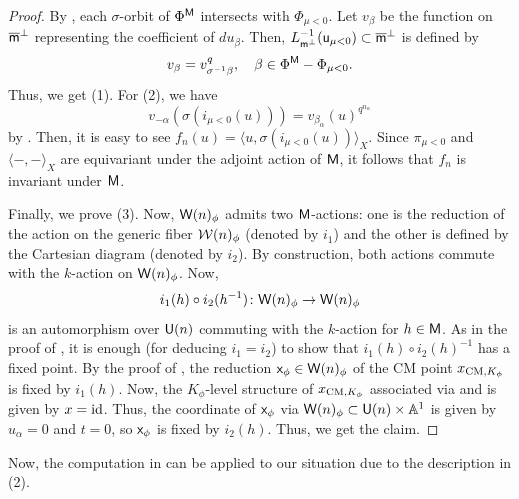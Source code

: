 \documentclass[12pt,reqno]{amsart}
\begin{document}
\begin{proof}
    By \cite[Lemma 3.2]{Tak25z}, each $\sigma$-orbit of $\Phi^{{\mathsf{M}}}$ intersects with $\Phi_{\mu < 0}$. Let $v_\beta$ be the function on ${\mathsf{{\overline{m}}}}^\perp$ representing the coefficient of $du_\beta$. Then, $L_{{\mathsf{m}}^\perp}^{-1}({\mathsf{u}}_{\mu < 0}) \subset {\mathsf{{\overline{m}}}}^\perp$ is defined by 
    \[
        v_{\beta} = v_{\sigma^{-1}\beta}^q, \quad \beta \in \Phi^{{\mathsf{M}}} - \Phi_{\mu < 0}. 
    \]
    Thus, we get (1). For (2), we have 
    \[
        v_{-\alpha}(\sigma(i_{\mu < 0}(u))) = v_{\beta_\alpha}(u)^{q^{n_\alpha}}
    \]
    by . Then, it is easy to see $f_n(u) = \langle u, \sigma(i_{\mu < 0}(u)) \rangle_X$. Since $\pi_{\mu < 0}$ and $\langle -, - \rangle_X$ are equivariant under the adjoint action of ${\mathsf{M}}$, it follows that $f_n$ is invariant under ${\mathsf{M}}$. 

    Finally, we prove (3). Now, ${\mathsf{W}}(n)_\phi$ admits two ${\mathsf{M}}$-actions: one is the reduction of the action on the generic fiber ${\mathcal{W}}(n)_\phi$ (denoted by $i_1$) and the other is defined by the Cartesian diagram (denoted by $i_2$). By construction, both actions commute with the $k$-action on ${\mathsf{W}}(n)_\phi$. Now, 
    \[
        i_1(h) \circ i_2(h^{-1}) \colon {\mathsf{W}}(n)_\phi \to {\mathsf{W}}(n)_\phi
    \]
    is an automorphism over ${\mathsf{U}}(n)$ commuting with the $k$-action for $h \in {\mathsf{M}}$. As in the proof of , it is enough (for deducing $i_1 = i_2$) to show that $i_1(h) \circ i_2(h)^{-1}$ has a fixed point. By the proof of , the reduction ${\mathsf{x}}_\phi \in {\mathsf{W}}(n)_\phi$ of the CM point $x_{{\operatorname{CM}}, K_\phi}$ is fixed by $i_1(h)$. Now, the $K_\phi$-level structure of $x_{{\operatorname{CM}}, K_\phi}$ associated via  and  is given by $x = {\operatorname{id}}$. Thus, the coordinate of ${\mathsf{x}}_\phi$ via ${\mathsf{W}}(n)_\phi \subset {\mathsf{U}}(n) \times \mathbb{A}^1$ is given by $u_\alpha = 0$ and $t = 0$, so ${\mathsf{x}}_\phi$ is fixed by $i_2(h)$. Thus, we get the claim. 
\end{proof}

Now, the computation in \cite[Section 5]{Tak26_Yu} can be applied to our situation due to the description in  (2). 
\end{document}
